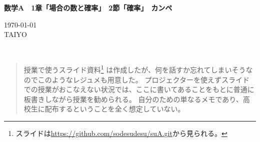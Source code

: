\documentclass[12pt]{ltjsarticle}\usepackage{ifthen}\newcounter{enlarge}\setcounter{enlarge}{1}
\newcommand{\LS}[2]{\ifthenelse{\value{enlarge}=2 \OR \value{enlarge}=3}{#1}{#2}}
\newcommand{\LO}[1]{\LS{#1}{\relax}}
\begin{document}


{\Large%
\noindent
\textbf{%
数学A　1章「場合の数と確率」　2節「確率」　カンペ
\LO{\\ \color{teal} 〈拡大版〉}}
}

\begin{flushleft}
\today \\
TAIYO
\end{flushleft}

{\footnotesize%
\mbox{}\\

}
\begin{quotation}
授業で使うスライド資料\footnote{%
スライドは\url{https://github.com/sodesudesu/suA.git}から見られる。
}
は作成したが、何を話すか忘れてしまいそうなのでこのようなレジュメも用意した。
プロジェクターを使えずスライドでの授業がおこなえない状況では、ここに書いてあることをもとに普通に板書きしながら授業を勧められる。
自分のための単なるメモであり、高校生に配布するということを全く想定していない。
\end{quotation}
\end{document}
